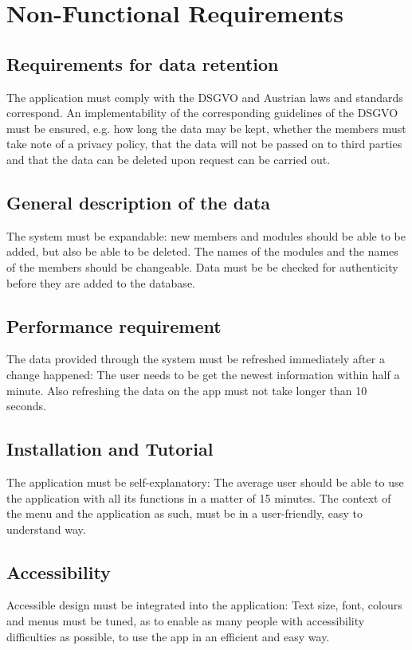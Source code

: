 \documentclass{scrreprt}
\begin{document}
	\chapter{Non-Functional Requirements}
	\section{Requirements for data retention}
	The application must comply with the DSGVO and Austrian laws and standards
	correspond. An implementability of the corresponding guidelines of the DSGVO must be ensured, e.g. how long the data may be kept, whether the members
	must take note of a privacy policy, that the data will not be passed on to third parties and that the data can be deleted upon request can be carried out.
	
	\section{General description of the data}
	The system must be expandable: new members and modules should be able to
	be added, but also be able to be deleted. The names
	of the modules and the names of the members should be changeable. Data must be
	be checked for authenticity before they are added to the database.
	
	\section{Performance requirement}
	The data provided through the system must be refreshed immediately after a change happened: The user needs to be get the newest information within half a minute. Also refreshing the data on the app must not take longer than 10 seconds.
	
	\section{Installation and Tutorial}
	The application must be self-explanatory: The average user should be able to use the application with all its functions in a matter of 15 minutes. The context of the menu and the application as such, must be in a user-friendly, easy to understand way.
	
	\section{Accessibility}
	Accessible design must be integrated into the application: Text size, font, colours and menus must be tuned, as to enable as many people with accessibility difficulties as possible, to use the app in an efficient and easy way.
	
\end{document}
